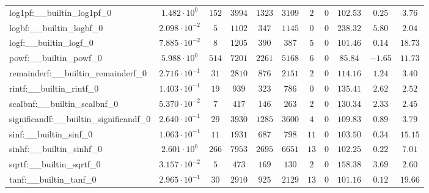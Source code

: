 \begin{tabular}{|l|c|c|c|c|c|c|c|c|c|c|}
log1pf:\_\_builtin\_log1pf\_0             & $ 1.482 \cdot 10^{0}  $ & $ 152    $ & $ 3994   $ & $ 1323  $ & $ 3109  $ & $ 2   $ & $ 0 $ & $ 102.53      $ & $ 0.25    $ & $ 3.76    $ \\
logbf:\_\_builtin\_logbf\_0               & $ 2.098 \cdot 10^{-2} $ & $ 5      $ & $ 1102   $ & $ 347   $ & $ 1145  $ & $ 0   $ & $ 0 $ & $ 238.32      $ & $ 5.80    $ & $ 2.04    $ \\
logf:\_\_builtin\_logf\_0                 & $ 7.885 \cdot 10^{-2} $ & $ 8      $ & $ 1205   $ & $ 390   $ & $ 387   $ & $ 5   $ & $ 0 $ & $ 101.46      $ & $ 0.14    $ & $ 18.73   $ \\
powf:\_\_builtin\_powf\_0                 & $ 5.988 \cdot 10^{0}  $ & $ 514    $ & $ 7201   $ & $ 2261  $ & $ 5168  $ & $ 6   $ & $ 0 $ & $ 85.84       $ & $ -1.65   $ & $ 11.73   $ \\
remainderf:\_\_builtin\_remainderf\_0     & $ 2.716 \cdot 10^{-1} $ & $ 31     $ & $ 2810   $ & $ 876   $ & $ 2151  $ & $ 2   $ & $ 0 $ & $ 114.16      $ & $ 1.24    $ & $ 3.40    $ \\
rintf:\_\_builtin\_rintf\_0               & $ 1.403 \cdot 10^{-1} $ & $ 19     $ & $ 939    $ & $ 323   $ & $ 786   $ & $ 0   $ & $ 0 $ & $ 135.41      $ & $ 2.62    $ & $ 2.52    $ \\
scalbnf:\_\_builtin\_scalbnf\_0           & $ 5.370 \cdot 10^{-2} $ & $ 7      $ & $ 417    $ & $ 146   $ & $ 263   $ & $ 2   $ & $ 0 $ & $ 130.34      $ & $ 2.33    $ & $ 2.45    $ \\
significandf:\_\_builtin\_significandf\_0 & $ 2.640 \cdot 10^{-1} $ & $ 29     $ & $ 3930   $ & $ 1285  $ & $ 3600  $ & $ 4   $ & $ 0 $ & $ 109.83      $ & $ 0.89    $ & $ 3.79    $ \\
sinf:\_\_builtin\_sinf\_0                 & $ 1.063 \cdot 10^{-1} $ & $ 11     $ & $ 1931   $ & $ 687   $ & $ 798   $ & $ 11  $ & $ 0 $ & $ 103.50      $ & $ 0.34    $ & $ 15.15   $ \\
sinhf:\_\_builtin\_sinhf\_0               & $ 2.601 \cdot 10^{0}  $ & $ 266    $ & $ 7953   $ & $ 2695  $ & $ 6651  $ & $ 13  $ & $ 0 $ & $ 102.25      $ & $ 0.22    $ & $ 7.01    $ \\
sqrtf:\_\_builtin\_sqrtf\_0               & $ 3.157 \cdot 10^{-2} $ & $ 5      $ & $ 473    $ & $ 169   $ & $ 130   $ & $ 2   $ & $ 0 $ & $ 158.38      $ & $ 3.69    $ & $ 2.60    $ \\
tanf:\_\_builtin\_tanf\_0                 & $ 2.965 \cdot 10^{-1} $ & $ 30     $ & $ 2910   $ & $ 925   $ & $ 2129  $ & $ 13  $ & $ 0 $ & $ 101.16      $ & $ 0.12    $ & $ 19.66   $ \\

\end{tabular}
